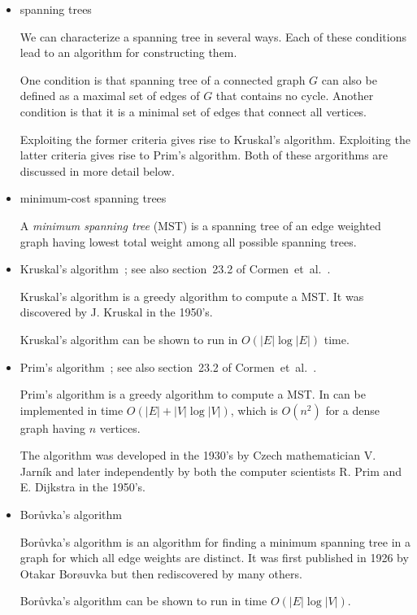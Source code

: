 \begin{itemize}
\item spanning trees

We can characterize a spanning tree in several ways. Each of these
conditions lead to an algorithm for constructing them.

One condition is that spanning tree of a connected graph $G$ can also
be defined as a maximal set of edges of $G$ that contains no cycle.
Another condition is that it is a minimal set of edges that connect
all vertices.

Exploiting the former criteria gives rise to Kruskal's algorithm.
Exploiting the latter criteria gives rise to Prim's algorithm.
Both of these argorithms are discussed in more detail below.

\item minimum-cost spanning trees

A {\it minimum spanning tree} (MST) is a spanning
tree of an edge weighted graph having lowest total weight
among all possible spanning trees.

\item Kruskal's algorithm~\cite{Kruskal1956}; see also section~23.2 of
  Cormen~et~al.~\cite{CormenEtAl2001}.

Kruskal's algorithm is a greedy algorithm to compute a MST.
It was discovered by J. Kruskal in the 1950's.

Kruskal's algorithm can be shown to run in $O(|E| \log |E|)$ time.


\item Prim's algorithm~\cite{Prim1957}; see also section~23.2 of
  Cormen~et~al.~\cite{CormenEtAl2001}.

Prim's algorithm is a greedy algorithm to compute a MST. In can be
implemented in time $O(|E| + |V| \log |V|)$, which is
$O(n^2)$ for a dense graph having $n$ vertices.

The algorithm was developed in the 1930's by Czech mathematician V.
Jarn\'ik and later independently by both the computer scientists R. Prim
and E. Dijkstra in the 1950's.

\item Bor\r{u}vka's algorithm~\cite{Boruvka1926a,Boruvka1926b}

Bor\r{u}vka's algorithm is an algorithm for finding a minimum spanning
tree in a graph
for which all edge weights are distinct.
It was first published in 1926 by Otakar Bor\o uvka but then
rediscovered by many others.

Bor\r{u}vka's algorithm can be shown to run in time
$O(|E|\log |V|)$.


\end{itemize}

